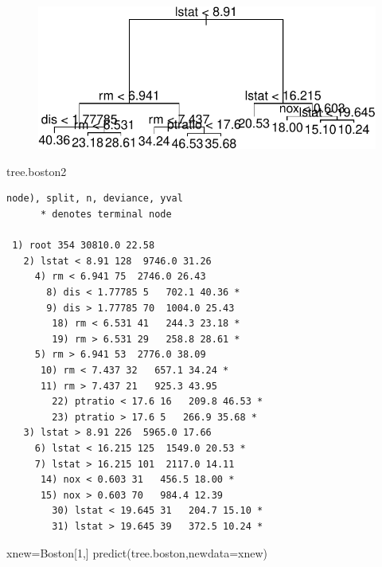 \documentclass[
  letterpaper,
  DIV=11,
  numbers=noendperiod]{scrartcl}
\newenvironment{Shaded}{\begin{snugshade}}{\end{snugshade}}
\newcommand{\AttributeTok}[1]{\textcolor[rgb]{0.40,0.45,0.13}{#1}}
\newcommand{\DecValTok}[1]{\textcolor[rgb]{0.68,0.00,0.00}{#1}}
\newcommand{\FunctionTok}[1]{\textcolor[rgb]{0.28,0.35,0.67}{#1}}
\newcommand{\NormalTok}[1]{\textcolor[rgb]{0.00,0.23,0.31}{#1}}
\newcommand{\OtherTok}[1]{\textcolor[rgb]{0.00,0.23,0.31}{#1}}
\begin{document}
\begin{figure}[H]

{\centering \includegraphics{L13_files/figure-pdf/unnamed-chunk-11-1.pdf}

}

\end{figure}

\begin{Shaded}
\begin{Highlighting}[]
\NormalTok{tree.boston2}
\end{Highlighting}
\end{Shaded}

\begin{verbatim}
node), split, n, deviance, yval
      * denotes terminal node

 1) root 354 30810.0 22.58  
   2) lstat < 8.91 128  9746.0 31.26  
     4) rm < 6.941 75  2746.0 26.43  
       8) dis < 1.77785 5   702.1 40.36 *
       9) dis > 1.77785 70  1004.0 25.43  
        18) rm < 6.531 41   244.3 23.18 *
        19) rm > 6.531 29   258.8 28.61 *
     5) rm > 6.941 53  2776.0 38.09  
      10) rm < 7.437 32   657.1 34.24 *
      11) rm > 7.437 21   925.3 43.95  
        22) ptratio < 17.6 16   209.8 46.53 *
        23) ptratio > 17.6 5   266.9 35.68 *
   3) lstat > 8.91 226  5965.0 17.66  
     6) lstat < 16.215 125  1549.0 20.53 *
     7) lstat > 16.215 101  2117.0 14.11  
      14) nox < 0.603 31   456.5 18.00 *
      15) nox > 0.603 70   984.4 12.39  
        30) lstat < 19.645 31   204.7 15.10 *
        31) lstat > 19.645 39   372.5 10.24 *
\end{verbatim}

\begin{Shaded}
\begin{Highlighting}[]
\NormalTok{xnew}\OtherTok{=}\NormalTok{Boston[}\DecValTok{1}\NormalTok{,]}
\FunctionTok{predict}\NormalTok{(tree.boston,}\AttributeTok{newdata=}\NormalTok{xnew)}
\end{Highlighting}
\end{Shaded}
\end{document}
